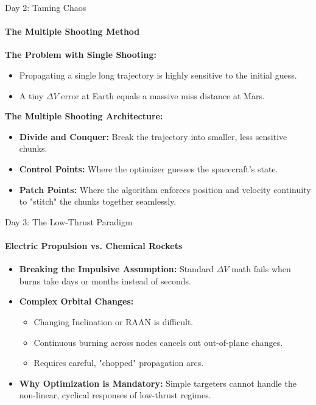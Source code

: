 \documentclass[aspectratio=169]{beamer}
\begin{document}
\begin{frame}{Day 2: Taming Chaos}
    \framesubtitle{The Multiple Shooting Method}
    
    \textbf{The Problem with Single Shooting:}
    \begin{itemize}
        \item Propagating a single long trajectory is highly sensitive to the initial guess.
        \item A tiny $\Delta V$ error at Earth equals a massive miss distance at Mars.
    \end{itemize}
    \vspace{0.3cm}
    
    \textbf{The Multiple Shooting Architecture:}
    \begin{itemize}
        \item \textbf{Divide and Conquer:} Break the trajectory into smaller, less sensitive chunks.
        \item \textbf{Control Points:} Where the optimizer guesses the spacecraft's state.
        \item \textbf{Patch Points:} Where the algorithm enforces position and velocity continuity to "stitch" the chunks together seamlessly.
    \end{itemize}
\end{frame}

\begin{frame}{Day 3: The Low-Thrust Paradigm}
    \framesubtitle{Electric Propulsion vs. Chemical Rockets}
    
    \begin{itemize}
        \item \textbf{Breaking the Impulsive Assumption:} Standard $\Delta V$ math fails when burns take days or months instead of seconds.
        \item \textbf{Complex Orbital Changes:} 
        \begin{itemize}
            \item Changing Inclination or RAAN is difficult.
            \item Continuous burning across nodes cancels out out-of-plane changes.
            \item Requires careful, "chopped" propagation arcs.
        \end{itemize}
        \item \textbf{Why Optimization is Mandatory:} Simple targeters cannot handle the non-linear, cyclical responses of low-thrust regimes.
    \end{itemize}
\end{frame}
\end{document}
